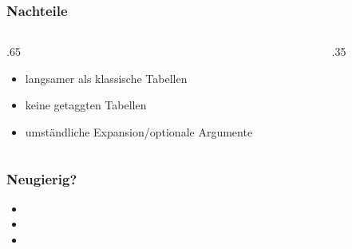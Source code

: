 \documentclass{ltx-talk}
\begin{document}
\begin{frame}
  \frametitle{Nachteile}
  \begin{columns}
    \begin{column}{.65\textwidth}
      \begin{itemize}
        \item langsamer als klassische Tabellen
        \item keine getaggten Tabellen
        \item umständliche Expansion/optionale Argumente
      \end{itemize}   
    \end{column}
    \begin{column}{.35\textwidth}
      \hfill\color{themecolor}\hspace*{1cm}
    \end{column}
  \end{columns}
\end{frame}

\begin{frame}
  \frametitle{Neugierig?}
  \begin{itemize}
    \item {}
    \item {}
    \item {}
  \end{itemize}
\end{frame}
\end{document}

